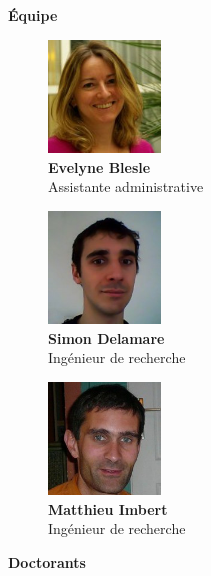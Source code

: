 \textbf{Équipe}
\begin{figure}[h!]
	\begin{minipage}{0.33\textwidth}
		\centering
		\includegraphics[height=3cm]{partie1/images/evelyne.jpeg}\\
		\textbf{Evelyne Blesle}\\
		Assistante administrative
	\end{minipage}\hfill
	\begin{minipage}{0.33\textwidth}
		\centering
		\includegraphics[width=3cm]{partie1/images/simon.jpeg}\\
		\textbf{Simon Delamare}\\
		Ingénieur de recherche
	\end{minipage}\hfill
	\begin{minipage}{0.33\textwidth}
		\centering
		\includegraphics[width=3cm]{partie1/images/matthieu.jpeg}\\
		\textbf{Matthieu Imbert}\\
		Ingénieur de recherche
	\end{minipage}
\end{figure}
\newpage
\textbf{Doctorants}
